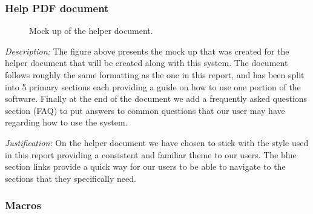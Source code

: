 \subsubsection{Help PDF document}

\begin{figure}[H]
\centering


\caption{Mock up of the helper document.}
\label{fig:help}
\end{figure}

\textit{Description:} The figure above presents the mock up 
that was created for the helper document that will be 
created along with this system. The document follows roughly
the same formatting as the one in this report, and has been 
split into 5 primary sections each providing a guide on how 
to use one portion of the software. Finally at the end of
the document we add a frequently asked questions section 
(FAQ) to put answers to common questions that our user may 
have regarding how to use the system.
\\ \vspace{0.2cm}

\textit{Justification:}
On the helper document we have chosen to stick with the
style used in this report providing a consistent and 
familiar theme to our users. The blue section links 
provide a quick way for our users to be able to navigate
to the sections that they specifically need. 

\subsubsection{Macros}

